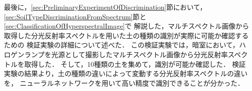 最後に，\ref{sec:PreliminaryExperimentOfDiscrimination}節において，
\ref{sec:SoilTypeDiscriminationFromSpectrum}節と\ref{sec:ClassificationOfHyperspectralImage}で
解説した，マルチスペクトル画像から取得した分光反射率スペクトルを用いた土の種類の識別が実際に可能か確認するための
検証実験の詳細について述べた．
この検証実験では，暗室において，ハロゲンランプを光源として撮影したマルチスペクトル画像から分光反射率スペクトルを取得した．
そして，10種類の土を集めて，識別が可能か確認した．
検証実験の結果より，土の種類の違いによって変動する分光反射率スペクトルの違いを，
ニューラルネットワークを用いて高い精度で識別できることが分かった．

\newpage
